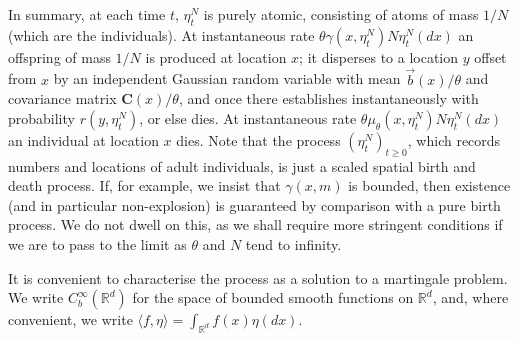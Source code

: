 \documentclass[12pt]{article}
\newcommand{\IR}{\mathbb R}
\newcommand{\meanq}{\vec b}    %
\newcommand{\covq}{\mathbf{C}}     %
\numberwithin{equation}{section}
\begin{document}
In summary, at each time $t$, $\eta^N_t$ is purely atomic, consisting of atoms of mass $1/N$
(which are the individuals).
At instantaneous rate $\theta \gamma(x, \eta^N_t) N \eta^N_t(dx)$ an offspring of mass $1/N$ is 
produced at location $x$; it disperses to 
a location $y$ offset from $x$
by an independent Gaussian random variable with mean $\meanq(x) / \theta$
and covariance matrix $\covq(x) / \theta$, and once there establishes instantaneously
with probability $r(y, \eta^N_t)$, or else dies. 
At instantaneous rate $\theta \mu_\theta(x, \eta^N_t) N \eta^N_t(dx)$ an individual at location 
$x$ dies.
Note that the process 
$\left(\eta^N_t\right)_{t\ge 0}$, which
records numbers and locations of adult individuals, is just a scaled spatial birth and 
death process. If, for example, we insist that $\gamma(x,m)$ is bounded, then 
existence (and in particular non-explosion) is guaranteed by comparison with
a pure birth process. We do not dwell on this, as we shall require more stringent conditions
if we are to pass to the limit as $\theta$ and $N$ tend to infinity.

It is convenient to characterise the process as a solution to a martingale problem.
We write $C_b^\infty(\IR^d)$ for the space of bounded smooth functions on $\IR^d$, and, where
convenient, we
write $\langle f, \eta \rangle = \int_{\IR^d} f(x) \eta(dx)$.
\end{document}
